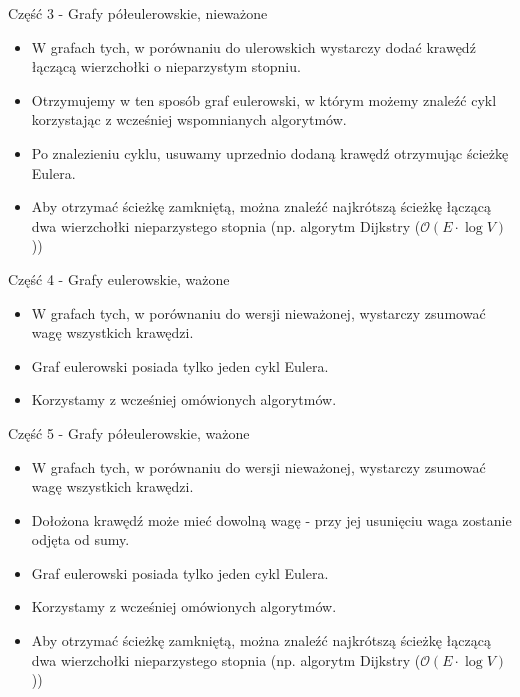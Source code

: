 \documentclass[polish,envcountsect,10pt]{beamer}
\begin{document}
\begin{frame}{Część 3 - Grafy półeulerowskie, nieważone}
    \begin{block}{}
        \begin{itemize}
            \item W grafach tych, w porównaniu do ulerowskich wystarczy dodać krawędź łączącą wierzchołki o nieparzystym stopniu.
            \item Otrzymujemy w ten sposób graf eulerowski, w którym możemy znaleźć cykl korzystając z wcześniej wspomnianych algorytmów.
            \item Po znalezieniu cyklu, usuwamy uprzednio dodaną krawędź otrzymując ścieżkę Eulera.
            \item Aby otrzymać ścieżkę zamkniętą, można znaleźć najkrótszą ścieżkę łączącą dwa wierzchołki nieparzystego stopnia (np. algorytm Dijkstry ($\mathcal{O}({E} \cdot {\log V})$))
        \end{itemize}
    \end{block}
\end{frame}

\begin{frame}{Część 4 - Grafy eulerowskie, ważone}
    \begin{block}{}
        \begin{itemize}
            \item W grafach tych, w porównaniu do wersji nieważonej, wystarczy zsumować wagę wszystkich krawędzi.
            \item Graf eulerowski posiada tylko jeden cykl Eulera.
            \item Korzystamy z wcześniej omówionych algorytmów.
        \end{itemize}
    \end{block}
\end{frame}

\begin{frame}{Część 5 - Grafy półeulerowskie, ważone}
    \begin{block}{}
        \begin{itemize}
            \item W grafach tych, w porównaniu do wersji nieważonej, wystarczy zsumować wagę wszystkich krawędzi.
            \item Dołożona krawędź może mieć dowolną wagę - przy jej usunięciu waga zostanie odjęta od sumy.
            \item Graf eulerowski posiada tylko jeden cykl Eulera.
            \item Korzystamy z wcześniej omówionych algorytmów.
            \item Aby otrzymać ścieżkę zamkniętą, można znaleźć najkrótszą ścieżkę łączącą dwa wierzchołki nieparzystego stopnia (np. algorytm Dijkstry ($\mathcal{O}({E} \cdot {\log V})$))
        \end{itemize}
    \end{block}
\end{frame}
\end{document}
